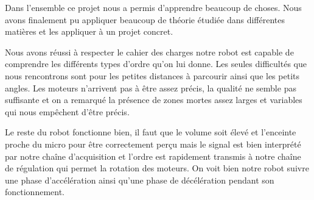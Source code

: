 Dans l’ensemble ce projet nous a permis d’apprendre beaucoup de choses. Nous avons finalement pu appliquer beaucoup de théorie étudiée dans différentes matières et les appliquer à un projet concret. 

Nous avons réussi à respecter le cahier des charges  notre robot est capable de comprendre les différents types d’ordre qu’on lui donne. Les seules difficultés que nous rencontrons sont pour les petites distances à parcourir ainsi que les petits angles. Les moteurs n’arrivent pas à être assez précis, la qualité ne semble pas suffisante et on a remarqué la présence de zones mortes assez larges et variables qui nous empêchent d’être précis. 

Le reste du robot fonctionne bien, il faut que le volume soit élevé et l’enceinte proche du micro pour être correctement perçu mais le signal est bien interprété par notre chaîne d’acquisition et l’ordre est rapidement transmis à notre chaîne de régulation qui permet la rotation des moteurs. On voit bien notre robot suivre une phase d’accélération ainsi qu’une phase de décélération pendant son fonctionnement. 
